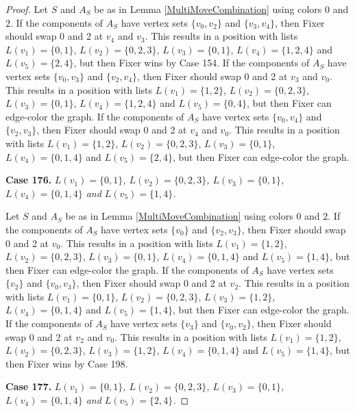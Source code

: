 \documentclass[12pt]{amsart}
\theoremstyle{plain}
\theoremstyle{definition}
\theoremstyle{remark}
\begin{document}
\begin{proof}
Let $S$ and $A_S$ be as in Lemma \ref{MultiMoveCombination} using colors $0$ and $2$. If the components of $A_S$ have vertex sets $\{v_0, v_2\}$ and $\{v_3, v_4\}$, then Fixer should swap 0 and 2 at $v_4$ and $v_3$. This results in a position with lists $L(v_1) = \{0, 1\}$, $L(v_2) = \{0, 2, 3\}$, $L(v_3) = \{0, 1\}$, $L(v_4) = \{1, 2, 4\}$ and $L(v_5) = \{2, 4\}$, but then Fixer wins by Case 154.
If the components of $A_S$ have vertex sets $\{v_0, v_3\}$ and $\{v_2, v_4\}$, then Fixer should swap 0 and 2 at $v_3$ and $v_0$. This results in a position with lists $L(v_1) = \{1, 2\}$, $L(v_2) = \{0, 2, 3\}$, $L(v_3) = \{0, 1\}$, $L(v_4) = \{1, 2, 4\}$ and $L(v_5) = \{0, 4\}$, but then Fixer can edge-color the graph.
If the components of $A_S$ have vertex sets $\{v_0, v_4\}$ and $\{v_2, v_3\}$, then Fixer should swap 0 and 2 at $v_4$ and $v_0$. This results in a position with lists $L(v_1) = \{1, 2\}$, $L(v_2) = \{0, 2, 3\}$, $L(v_3) = \{0, 1\}$, $L(v_4) = \{0, 1, 4\}$ and $L(v_5) = \{2, 4\}$, but then Fixer can edge-color the graph.

\noindent\textbf{Case 176.  }\textit{$L(v_1) = \{0, 1\}$, $L(v_2) = \{0, 2, 3\}$, $L(v_3) = \{0, 1\}$, $L(v_4) = \{0, 1, 4\}$ and $L(v_5) = \{1, 4\}$.}

Let $S$ and $A_S$ be as in Lemma \ref{MultiMoveCombination} using colors $0$ and $2$. If the components of $A_S$ have vertex sets $\{v_0\}$ and $\{v_2, v_3\}$, then Fixer should swap 0 and 2 at $v_0$. This results in a position with lists $L(v_1) = \{1, 2\}$, $L(v_2) = \{0, 2, 3\}$, $L(v_3) = \{0, 1\}$, $L(v_4) = \{0, 1, 4\}$ and $L(v_5) = \{1, 4\}$, but then Fixer can edge-color the graph.
If the components of $A_S$ have vertex sets $\{v_2\}$ and $\{v_0, v_3\}$, then Fixer should swap 0 and 2 at $v_2$. This results in a position with lists $L(v_1) = \{0, 1\}$, $L(v_2) = \{0, 2, 3\}$, $L(v_3) = \{1, 2\}$, $L(v_4) = \{0, 1, 4\}$ and $L(v_5) = \{1, 4\}$, but then Fixer can edge-color the graph.
If the components of $A_S$ have vertex sets $\{v_3\}$ and $\{v_0, v_2\}$, then Fixer should swap 0 and 2 at $v_2$ and $v_0$. This results in a position with lists $L(v_1) = \{1, 2\}$, $L(v_2) = \{0, 2, 3\}$, $L(v_3) = \{1, 2\}$, $L(v_4) = \{0, 1, 4\}$ and $L(v_5) = \{1, 4\}$, but then Fixer wins by Case 198.

\noindent\textbf{Case 177.  }\textit{$L(v_1) = \{0, 1\}$, $L(v_2) = \{0, 2, 3\}$, $L(v_3) = \{0, 1\}$, $L(v_4) = \{0, 1, 4\}$ and $L(v_5) = \{2, 4\}$.}


\end{proof}
\end{document}
